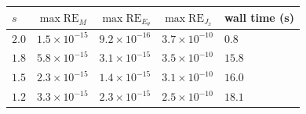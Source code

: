 \begin{tabular}{lllll}
\toprule
\(s\) & \(\max\mathrm{RE}_{M}\) & \(\max\mathrm{RE}_{E_\theta}\) & \(\max\mathrm{RE}_{J_x}\) & wall time (s) \\
\midrule
\(2.0\) & \(1.5\times10^{-15}\) & \(9.2\times10^{-16}\) & \(3.7\times10^{-10}\) & \(0.8\) \\
\(1.8\) & \(5.8\times10^{-15}\) & \(3.1\times10^{-15}\) & \(3.5\times10^{-10}\) & \(15.8\) \\
\(1.5\) & \(2.3\times10^{-15}\) & \(1.4\times10^{-15}\) & \(3.1\times10^{-10}\) & \(16.0\) \\
\(1.2\) & \(3.3\times10^{-15}\) & \(2.3\times10^{-15}\) & \(2.5\times10^{-10}\) & \(18.1\) \\
\bottomrule
\end{tabular}
